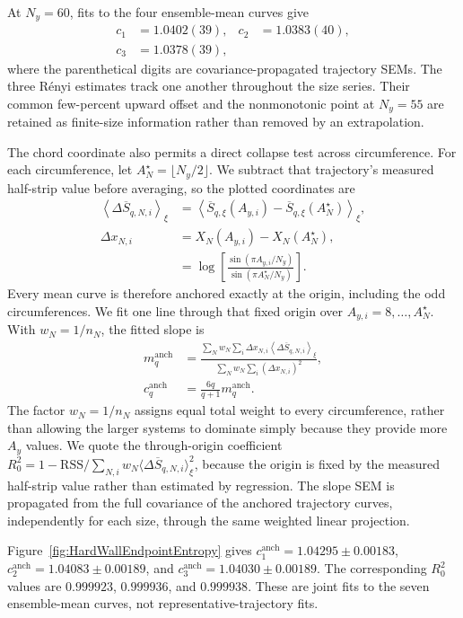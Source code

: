 \documentclass[aps,prb,twocolumn,superscriptaddress,longbibliography,floatfix]{revtex4-2}
\theoremstyle{plain}
\theoremstyle{definition}
\theoremstyle{remark}
\begin{document}
At $N_y=60$, fits to the four ensemble-mean curves give
\begin{align}
 c_1&=1.0402(39), & c_2&=1.0383(40),
 \nonumber\\
 c_3&=1.0378(39),
 \label{eq:HardWallEndpointCentralCharges}
\end{align}
where the parenthetical digits are covariance-propagated trajectory SEMs.
The three R\'enyi estimates track one another throughout the size series.
Their common few-percent upward offset and the nonmonotonic point at $N_y=55$
are retained as finite-size information rather than removed by an
extrapolation.

The chord coordinate also permits a direct collapse test across circumference.
For each circumference, let $A_N^\star=\lfloor N_y/2\rfloor$.  We subtract
that trajectory's measured half-strip value before averaging, so the plotted
coordinates are
\begin{align*}
 \left\langle\Delta\overline S_{q,N,i}\right\rangle_\xi
 &=\left\langle
 \overline S_{q,\xi}(A_{y,i})-
 \overline S_{q,\xi}(A_N^\star)
 \right\rangle_\xi,\\
 \Delta x_{N,i}
 &=X_N(A_{y,i})-X_N(A_N^\star),\\
 &=\log\!\left[
 \frac{\sin(\pi A_{y,i}/N_y)}
      {\sin(\pi A_N^\star/N_y)}\right].
\end{align*}
Every mean curve is therefore anchored exactly at the origin, including the
odd circumferences.  We fit one line through that fixed origin over
$A_{y,i}=8,\ldots,A_N^\star$.  With $w_N=1/n_N$, the fitted slope is
\begin{align*}
 m_q^{\mathrm{anch}}
 &=\frac{\displaystyle\sum_N w_N\sum_i
 \Delta x_{N,i}\left\langle\Delta\overline S_{q,N,i}\right\rangle_\xi}
 {\displaystyle\sum_N w_N\sum_i(\Delta x_{N,i})^2},\\
 c_q^{\mathrm{anch}}&=\frac{6q}{q+1}m_q^{\mathrm{anch}}.
\end{align*}
The factor $w_N=1/n_N$ assigns equal total weight to every circumference,
rather than allowing the larger systems to dominate simply because they
provide more $A_y$ values.  We quote the through-origin coefficient
$R_0^2=1-\mathrm{RSS}/\sum_{N,i}w_N
\langle\Delta\overline S_{q,N,i}\rangle_\xi^2$, because the origin is
fixed by the measured half-strip value rather than estimated by regression.
The slope SEM is propagated from the full covariance of the anchored
trajectory curves, independently for each size, through the same weighted
linear projection.

Figure~\ref{fig:HardWallEndpointEntropy} gives
$c_1^{\mathrm{anch}}=1.04295\pm0.00183$,
$c_2^{\mathrm{anch}}=1.04083\pm0.00189$, and
$c_3^{\mathrm{anch}}=1.04030\pm0.00189$.  The corresponding $R_0^2$ values are
$0.999923$, $0.999936$, and $0.999938$.  These are joint fits to the seven
ensemble-mean curves, not representative-trajectory fits.
\end{document}
